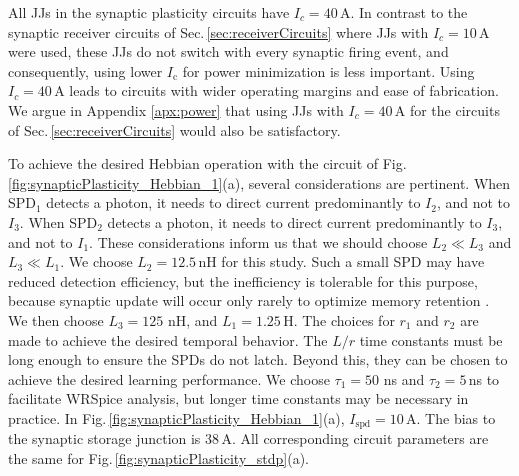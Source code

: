 \documentclass[twocolumn]{article}
\begin{document}
All JJs in the synaptic plasticity circuits have $I_c = 40$\,\textmu A. In contrast to the synaptic receiver circuits of Sec.\,\ref{sec:receiverCircuits} where JJs with $I_c = 10$\,\textmu A were used, these JJs do not switch with every synaptic firing event, and consequently, using lower $I_{\mathrm{c}}$ for power minimization is less important. Using $I_c = 40$\,\textmu A leads to circuits with wider operating margins and ease of fabrication. We argue in Appendix \ref{apx:power} that using JJs with $I_c = 40$\,\textmu A for the circuits of Sec.\,\ref{sec:receiverCircuits} would also be satisfactory.

To achieve the desired Hebbian operation with the circuit of Fig.\,\ref{fig:synapticPlasticity_Hebbian_1}(a), several considerations are pertinent. When SPD$_1$ detects a photon, it needs to direct current predominantly to $I_2$, and not to $I_3$. When SPD$_2$ detects a photon, it needs to direct current predominantly to $I_3$, and not to $I_1$. These considerations inform us that we should choose $L_2 \ll L_3$ and $L_3 \ll L_1$. We choose $L_2 = 12.5$\,nH for this study. Such a small SPD may have reduced detection efficiency, but the inefficiency is tolerable for this purpose, because synaptic update will occur only rarely to optimize memory retention \cite{fuab2007,lide2015}. We then choose $L_3 = 125$ nH, and $L_1 = 1.25$\,\textmu H. The choices for $r_1$ and $r_2$ are made to achieve the desired temporal behavior. The $L/r$ time constants must be long enough to ensure the SPDs do not latch. Beyond this, they can be chosen to achieve the desired learning performance. We choose $\tau_1 = 50$ ns and $\tau_2 = 5$\,ns to facilitate WRSpice analysis, but longer time constants may be necessary in practice. In Fig.\,\ref{fig:synapticPlasticity_Hebbian_1}(a), $I_{\mathrm{spd}} = 10$\,\textmu A. The bias to the synaptic storage junction is 38\,\textmu A. All corresponding circuit parameters are the same for Fig.\,\ref{fig:synapticPlasticity_stdp}(a).
\end{document}
